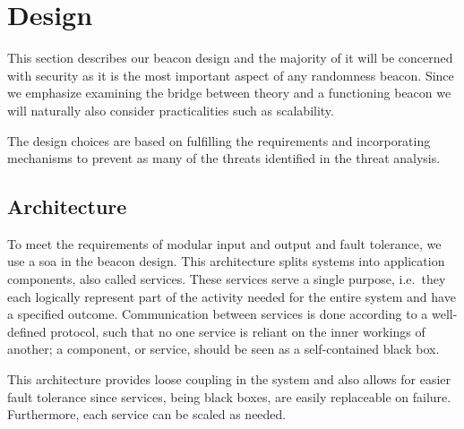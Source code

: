 \section{Design}\label{sec:design}

This section describes our beacon design and the majority of it will be concerned with security as it is the most important aspect of any randomness beacon. Since we emphasize examining the bridge between theory and a functioning beacon we will naturally also consider practicalities such as scalability.

The design choices are based on fulfilling the requirements and incorporating mechanisms to prevent as many of the threats identified in the threat analysis.

\subsection{Architecture}\label{sec:design_architecture}
To meet the requirements of modular input and output and fault tolerance, we use a \gls{soa} in the beacon design.
This architecture splits systems into application components, also called services.
These services serve a single purpose, i.e.\ they each logically represent part of the activity needed for the entire system and have a specified outcome.
Communication between services is done according to a well-defined protocol, such that no one service is reliant on the inner workings of another;
a component, or service, should be seen as a self-contained black box.

This architecture provides loose coupling in the system and also allows for easier fault tolerance since services, being black boxes, are easily replaceable on failure.
Furthermore, each service can be scaled as needed.